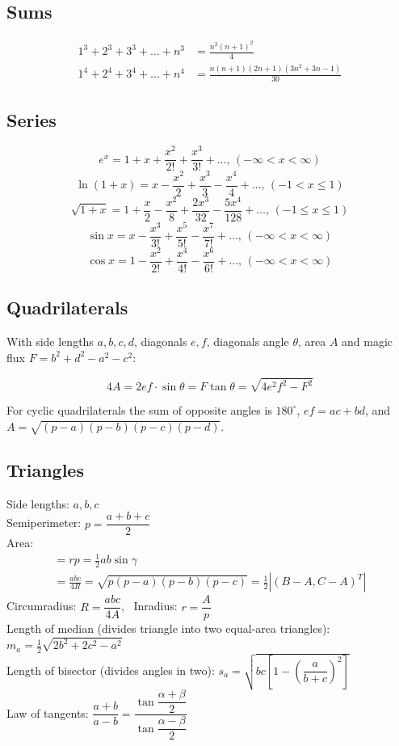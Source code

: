 \documentclass[
	a4paper,
	landscape,
	10pt,
]{article}
\begin{document}
\begin{multicols}{3}
	\subsection{Sums} \vspace{-1cm}
		\begin{align*}
			1^3 + 2^3 + 3^3 + \dots + n^3 &= \frac{n^2(n+1)^2}{4} \\
			1^4 + 2^4 + 3^4 + \dots + n^4 &= \frac{n(n+1)(2n+1)(3n^2 + 3n - 1)}{30}
		\end{align*}
	\subsection{Series} \vspace{-1cm}
		$$e^x = 1+x+\frac{x^2}{2!}+\frac{x^3}{3!}+\dots,\,(-\infty<x<\infty)$$
		$$\ln(1+x) = x-\frac{x^2}{2}+\frac{x^3}{3}-\frac{x^4}{4}+\dots,\,(-1<x\leq1)$$
		$$\sqrt{1+x} = 1+\frac{x}{2}-\frac{x^2}{8}+\frac{2x^3}{32}-\frac{5x^4}{128}+\dots,\,(-1\leq x\leq1)$$
		$$\sin x = x-\frac{x^3}{3!}+\frac{x^5}{5!}-\frac{x^7}{7!}+\dots,\,(-\infty<x<\infty)$$
		$$\cos x = 1-\frac{x^2}{2!}+\frac{x^4}{4!}-\frac{x^6}{6!}+\dots,\,(-\infty<x<\infty)$$

	\subsection{Quadrilaterals}
        With side lengths $a,b,c,d$, diagonals $e, f$, diagonals angle $\theta$, area $A$ and
        magic flux $F=b^2+d^2-a^2-c^2$:
        
        \[ 4A = 2ef \cdot \sin\theta = F\tan\theta = \sqrt{4e^2f^2-F^2} \]
        
         For cyclic quadrilaterals the sum of opposite angles is $180^\circ$,
        $ef = ac + bd$, and $A = \sqrt{(p-a)(p-b)(p-c)(p-d)}$.
        
        
	\subsection{Triangles}
        Side lengths: $a,b,c$\\
        Semiperimeter: $p=\dfrac{a+b+c}{2}$\\
        Area: %
		\begin{gather*}
			[ABC]
			= rp
			= \frac 12 ab\sin\gamma \\
			= \frac{abc}{4R}
			= \sqrt{p(p-a)(p-b)(p-c)}
			= \frac 12\left| (B-A, C-A)^T \right|
		\end{gather*}
        Circumradius: $R=\dfrac{abc}{4A}$,~
        Inradius: $r=\dfrac{A}{p}$\\
        Length of median (divides triangle into two equal-area triangles): $m_a=\tfrac{1}{2}\sqrt{2b^2+2c^2-a^2}$\\
        Length of bisector (divides angles in two): $s_a=\sqrt{bc\left[1-\left(\dfrac{a}{b+c}\right)^2\right]}$\\
        Law of tangents: $\dfrac{a+b}{a-b}=\dfrac{\tan\dfrac{\alpha+\beta}{2}}{\tan\dfrac{\alpha-\beta}{2}}$


\end{multicols}
\end{document}
